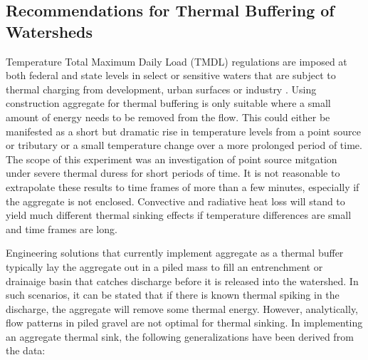

\subsection{Recommendations for Thermal Buffering of Watersheds}

Temperature Total Maximum Daily Load (TMDL) regulations are imposed at both federal and state levels in select or sensitive waters that are subject to thermal charging from development, urban surfaces or industry \citep{urban}. Using construction aggregate for thermal buffering is only suitable where a small amount of energy needs to be removed from the flow. This could either be manifested as a short but dramatic rise in temperature levels from a point source or tributary or a small temperature change over a more prolonged period of time. The scope of this experiment was an investigation of point source mitgation under severe thermal duress for short periods of time. It is not reasonable to extrapolate these results to   time frames of more than a few minutes, especially if the aggregate is not enclosed. Convective and radiative heat loss will stand to yield much different thermal sinking effects if temperature differences are small and time frames are long.

Engineering solutions that currently implement aggregate as a thermal buffer typically lay the aggregate out in a piled mass to fill an entrenchment or drainaige basin that catches discharge before it is released into the watershed. In such scenarios, it can be stated that if there is known thermal spiking in the discharge, the aggregate will remove some thermal energy. However, analytically, flow patterns in piled gravel are not optimal for thermal sinking. In implementing an aggregate thermal sink, the following generalizations have been derived from the data:

